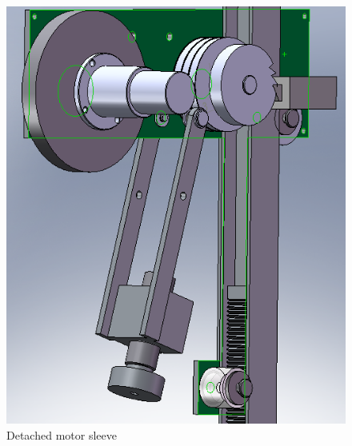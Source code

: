 \begin{frame}
\begin{columns}
\begin{figure}
\centering
\includegraphics[width=\textwidth]{fig/hopper_detach.png}
\caption{Detached motor sleeve}
\end{figure}


\end{columns}
\end{frame}
